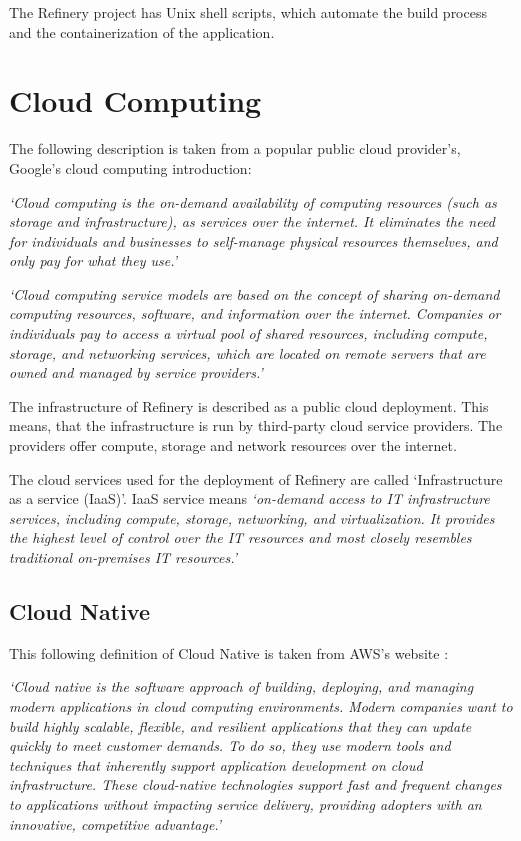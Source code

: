	The Refinery project has Unix shell scripts, which automate the build process and the containerization of the application.

\section{Cloud Computing}
	The following description is taken from a popular public cloud provider's, Google's cloud computing introduction:

	\textit{`Cloud computing \cite{cloud} is the on-demand availability of computing resources (such as storage and infrastructure), as services over the internet. 
	It eliminates the need for individuals and businesses to self-manage physical resources themselves, and only pay for what they use.'}

	\textit{`Cloud computing service models are based on the concept of sharing on-demand computing resources, software, and information over the internet. 
	Companies or individuals pay to access a virtual pool of shared resources, including compute, storage, and networking services, which are located on
	remote servers that are owned and managed by service providers.'}

	The infrastructure of Refinery is described as a public cloud deployment. 
	This means, that the infrastructure is run by third-party cloud service providers.
	The providers offer compute, storage and network resources over the internet. 

	The cloud services used for the deployment of Refinery are called `Infrastructure as a service (IaaS)'.
	IaaS service means \cite{cloud} \textit{`on-demand access to IT infrastructure services, 
		including compute, storage, networking, and virtualization. It provides the highest level of control over the IT 
		resources and most closely resembles traditional on-premises IT resources.'}

	\subsection{Cloud Native}
		This following definition of Cloud Native is taken from AWS's website \cite{cloudnative}:

		\textit{
			`Cloud native is the software approach of building, deploying, and managing modern applications 
			in cloud computing environments. Modern companies want to build highly scalable, flexible, and 
			resilient applications that they can update quickly to meet customer demands. 
			To do so, they use modern tools and techniques that inherently support application
			development on cloud infrastructure. These cloud-native technologies support fast 
			and frequent changes to applications without impacting service delivery, providing
			adopters with an innovative, competitive advantage.'
		}

